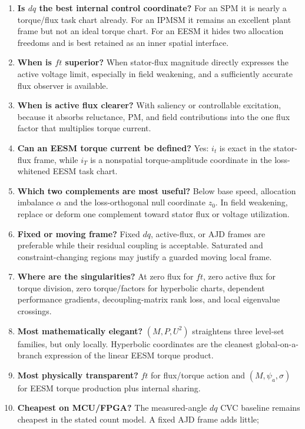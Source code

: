 \begin{enumerate}
 \item \textbf{Is \(dq\) the best internal control coordinate?} For an SPM it
 is nearly a torque/flux task chart already. For an IPMSM it remains an
 excellent plant frame but not an ideal torque chart. For an EESM it hides two
 allocation freedoms and is best retained as an inner spatial interface.
 \item \textbf{When is \(ft\) superior?} When stator-flux magnitude directly
 expresses the active voltage limit, especially in field weakening, and a
 sufficiently accurate flux observer is available.
 \item \textbf{When is active flux clearer?} With saliency or controllable
 excitation, because it absorbs reluctance, PM, and field contributions into
 the one flux factor that multiplies torque current.
 \item \textbf{Can an EESM torque current be defined?} Yes: \(i_t\) is exact
 in the stator-flux frame, while \(i_T\) is a nonspatial torque-amplitude
 coordinate in the loss-whitened EESM task chart.
 \item \textbf{Which two complements are most useful?} Below base speed,
 allocation imbalance \(\alpha\) and the loss-orthogonal null coordinate
 \(z_0\). In field weakening, replace or deform one complement toward stator
 flux or voltage utilization.
 \item \textbf{Fixed or moving frame?} Fixed \(dq\), active-flux, or AJD
 frames are preferable while their residual coupling is acceptable. Saturated
 and constraint-changing regions may justify a guarded moving local frame.
 \item \textbf{Where are the singularities?} At zero flux for \(ft\), zero
 active flux for torque division, zero torque/factors for hyperbolic charts,
 dependent performance gradients, decoupling-matrix rank loss, and local
 eigenvalue crossings.
 \item \textbf{Most mathematically elegant?} \((M,P,U^2)\) straightens three
 level-set families, but only locally. Hyperbolic coordinates are the cleanest
 global-on-a-branch expression of the linear EESM torque product.
 \item \textbf{Most physically transparent?} \(ft\) for flux/torque action and
 \((M,\psi_a,\sigma)\) for EESM torque production plus internal sharing.
 \item \textbf{Cheapest on MCU/FPGA?} The measured-angle \(dq\) CVC baseline
 remains cheapest in the stated count model. A fixed AJD frame adds little;

\end{enumerate}
